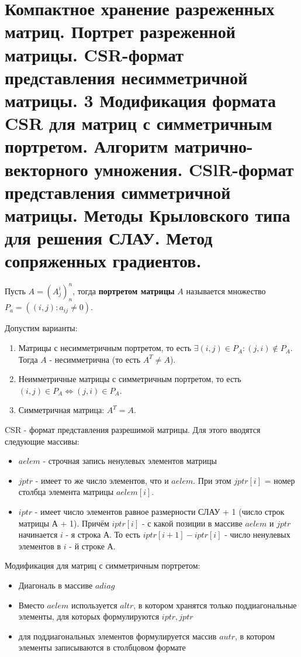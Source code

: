 \documentclass[__main__.tex]{subfiles}
\begin{document}
\section{Компактное хранение разреженных матриц. Портрет разреженной матрицы. CSR-формат представления несимметричной матрицы. 3 Модификация формата CSR для матриц с симметричным портретом. Алгоритм матрично-векторного умножения. CSlR-формат представления симметричной матрицы. Методы Крыловского типа для решения СЛАУ. Метод сопряженных градиентов.}

Пусть $A = \left(A^i_j\right)^n_n$, тогда \textbf{портретом матрицы} $A$ называется множество $P_a = \left(\left(i, j\right): a_{ij} \neq 0\right)$.

Допустим варианты:

\begin{enumerate}
	\item Матрицы с несимметричным портретом, то есть $\exists \left(i, j\right) \in P_A: \left(j, i\right) \notin P_A$. Тогда $A$ - несимметрична (то есть $A^T \neq A$).

	\item Неимметричные матрицы с симметричным портретом, то есть $\left(i, j\right) \in P_A \Leftrightarrow \left(j, i\right) \in P_A$.

	\item Симметричная матрица: $A^T = A$.
\end{enumerate}

CSR - формат представления разрешимой матрицы. Для этого вводятся следующие массивы:

\begin{itemize}
	\item $aelem$ - строчная запись ненулевых элементов матрицы

	\item $jptr$ - имеет то же число элементов, что и $aelem$. При этом $jptr\left[i\right]$ = номер столбца элемента матрицы $aelem\left[i\right]$.

	\item $iptr$ - имеет число элементов равное размерности СЛАУ + 1 (число строк матрицы А + 1). Причём $iptr\left[i\right]$ - с какой позиции в массиве $aelem$ и $jptr$ начинается $i$ - я строка А. То есть $iptr\left[i + 1\right] - iptr\left[i\right]$ - число ненулевых элементов в $i$ - й строке А.
\end{itemize}

Модификация для матриц с симметричным портретом:

\begin{itemize}
	\item Диагональ в массиве $adiag$

	\item Вместо $aelem$ используется $altr$, в котором хранятся только поддиагональные элементы, для которых формулируются $iptr, jptr$

	\item для поддиагональных элементов формулируется массив $autr$, в котором элементы записываются в столбцовом формате
\end{itemize}
\end{document}
